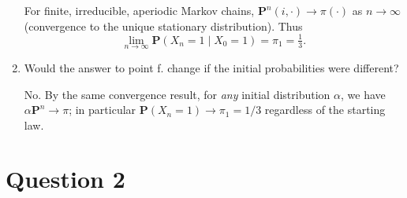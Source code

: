 \documentclass[dvipsnames,11pt]{article}
\begin{document}
\begin{enumerate}[label=\alph*.]
\begin{solution}
                For finite, irreducible, aperiodic Markov chains, $\mathbf{P}^n(i,\cdot)\to\pi(\cdot)$ as $n\to\infty$ (convergence to the unique stationary distribution). Thus
                \[
                \lim_{n\to\infty}\mathbf P(X_n=1\mid X_0=1)=\pi_1=\tfrac13.
                \]
                
            \end{solution}
            
        \item Would the answer to point f. change if the initial probabilities were different?
    
            \begin{solution}
    
                No. By the same convergence result, for \emph{any} initial distribution $\alpha$, we have $\alpha \mathbf{P}^n\to \pi$; in particular $\mathbf P(X_n=1)\to \pi_1=1/3$ regardless of the starting law.
                
            \end{solution}
            
    \end{enumerate}


\newpage
\setcounter{section}{2}
\section*{Question 2}
\end{document}

